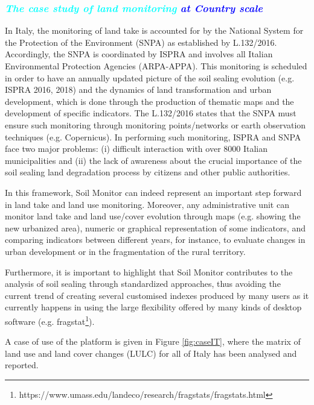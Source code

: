 \documentclass[APA,LATO1COL,doublespace]{WileyNJD-v2}
\newcommand{\reviewer}[1]{\emph{\textcolor{cyan}{#1}}}   %
\newcommand{\update}[1]{\emph{\textcolor{blue}{#1}}}     %
\begin{document}
\subsubsection{\reviewer{The case study of land monitoring} \update{at Country scale} }
In Italy, the monitoring of land take is accounted for by the National System for the Protection of the Environment (SNPA) as established by L.132/2016.
Accordingly, the SNPA is coordinated by ISPRA and involves all Italian Environmental Protection Agencies (ARPA-APPA). 
This monitoring is scheduled in order to have an annually updated picture of the soil sealing evolution (e.g. ISPRA 2016, 2018) and the dynamics of land transformation and urban development, which is done through the production of thematic maps and the development of specific indicators. 
The L.132/2016 states that the SNPA must ensure such monitoring through monitoring points/networks or earth observation techniques (e.g. Copernicus).
In performing such monitoring, ISPRA and SNPA face two major problems: (i) difficult interaction with over 8000 Italian municipalities and (ii) the lack of awareness about the crucial importance of the soil sealing land degradation process by citizens and other public authorities.

In this framework, Soil Monitor can indeed represent an important step forward in land take and land use monitoring.
Moreover, any administrative unit can monitor land take and land use/cover evolution through maps (e.g. showing the new urbanized area), numeric or graphical representation of some indicators, and comparing indicators between different years, for instance, to evaluate changes in urban development or in the fragmentation of the rural territory.

Furthermore, it is important to highlight that Soil Monitor contributes to the analysis of soil sealing through standardized approaches, thus avoiding the current trend of creating several customised indexes produced by many users as it currently happens in using the large flexibility offered by many kinds of desktop software (e.g. fragstat\footnote{https://www.umass.edu/landeco/research/fragstats/fragstats.html}). 

A case of use of the platform is given in Figure \ref{fig:caseIT}, where the matrix of land use and land cover changes (LULC) for all of Italy has been analysed and reported. 
\end{document}

